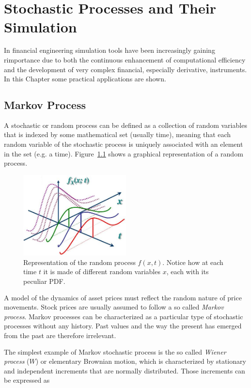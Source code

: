 \chapter{Stochastic Processes and Their Simulation}

In financial engineering simulation tools have been increasingly gaining rimportance due to both the continuous enhancement of computational efficiency and the development of very complex financial, especially derivative, instruments. In this Chapter some practical applications are shown.

\section{Markov Process}

A stochastic or random process can be defined as a collection of random variables that is indexed by some mathematical set (usually time), meaning that each random variable of the stochastic process is uniquely associated with an element in the set (e.g. a time). Figure~\ref{fig:random_process} shows a graphical representation of a random process.

\begin{figure}[htb]
	\centering
	\includegraphics[width=0.5\textwidth]{figures/random_process}
	\caption{Representation of the random process $f(x, t)$. Notice how at each time $t$ it is made of different random variables $x$, each with its peculiar PDF.}
	\label{fig:random_process}
\end{figure}

A model of the dynamics of asset prices must reflect the random nature of price movements. Stock prices are usually assumed to follow a so called \emph{Markov process}. Markov processes can be characterized as a particular type of stochastic processes without any history. Past values
and the way the present has emerged from the past are therefore irrelevant. 

The simplest example of Markov stochastic process is the so called \emph{Wiener process} ($W$) or elementary Brownian motion, which is characterized by stationary and independent increments that are normally distributed. Those increments can be expressed as

